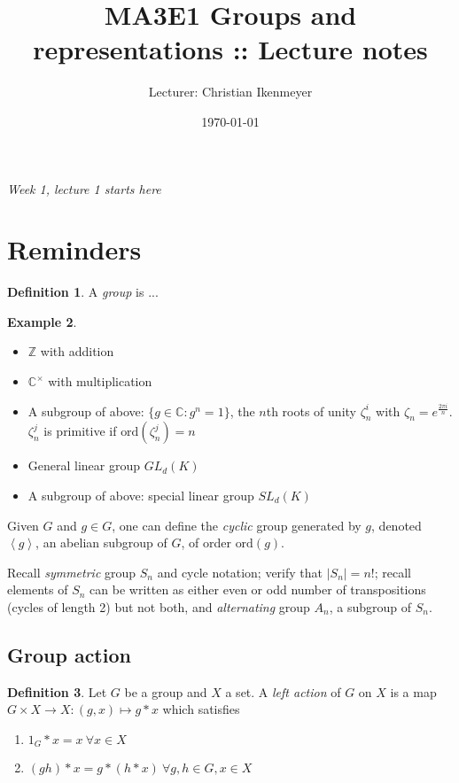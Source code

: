 \documentclass{article}
\title{MA3E1 Groups and representations :: Lecture notes}
\author{Lecturer: Christian Ikenmeyer}
\date{\today}
\newcommand{\la}{\left\langle}
\newcommand{\ra}{\right\rangle}
\newcommand{\Z}{\mathbb{Z}}
\newcommand{\C}{\mathbb{C}}
\newcommand{\ord}{\text{ord}}
\theoremstyle{definition}
\newtheorem{defn}{Definition}[subsection]
\newtheorem{example}[defn]{Example}
\begin{document}
\maketitle
\thispagestyle{empty}

\tableofcontents
\thispagestyle{empty}
\newpage
\setcounter{page}{1}

\begin{flushright}
\textit{Week 1, lecture 1 starts here}
\end{flushright}

\section{Reminders}
\begin{defn}
A \textit{group} is ...
\end{defn}

\begin{example}
\begin{itemize}
\item $\Z$ with addition
\item $\C^\times$ with multiplication
\item A subgroup of above: $\{g\in\C:g^n=1\}$, the $n$th roots of unity $\zeta_n^i$ with $\zeta_n=e^{\frac{2\pi i}{n}}$. $\zeta_n^j$ is primitive if $\ord(\zeta_n^j)=n$
\item General linear group $GL_d(K)$
\item A subgroup of above: special linear group $SL_d(K)$
\end{itemize}
\end{example}

Given $G$ and $g\in G$, one can define the \textit{cyclic} group generated by $g$, denoted $\la g\ra$, an abelian subgroup of $G$, of order $\ord(g)$.

Recall \textit{symmetric} group $S_n$ and cycle notation; verify that $|S_n|=n!$; recall elements of $S_n$ can be written as either even or odd number of transpositions (cycles of length 2) but not both, and \textit{alternating} group $A_n$, a subgroup of $S_n$.

\subsection{Group action}

\begin{defn}
Let $G$ be a group and $X$ a set. A \textit{left action} of $G$ on $X$ is a map $G\times X\rightarrow X:(g,x)\mapsto g\ast x$ which satisfies
\begin{enumerate}
\item $1_G\ast x=x \ \forall x\in X$
\item $(gh)\ast x=g\ast(h\ast x) \ \forall g,h\in G,x\in X$
\end{enumerate}
\end{defn}
\end{document}
